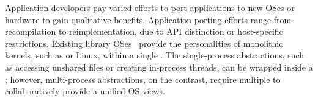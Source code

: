 Application developers pay varied efforts to port applications
to new OSes or hardware
to gain qualitative benefits.
Application porting efforts range from recompilation to reimplementation,
due to
API distinction
or host-specific restrictions.
Existing library OSes~\cite{porter11drawbridge, baumann13bascule, baumann14haven}
provide the personalities of monolithic kernels, such as \win{} or Linux,
within a single \picoproc{}.
The single-process abstractions,
such as accessing unshared files or creating in-process threads,
can be wrapped inside a \libos{};
however, multi-process abstractions, on the contrast, require
multiple \picoprocs{} to collaboratively provide a unified OS views.



